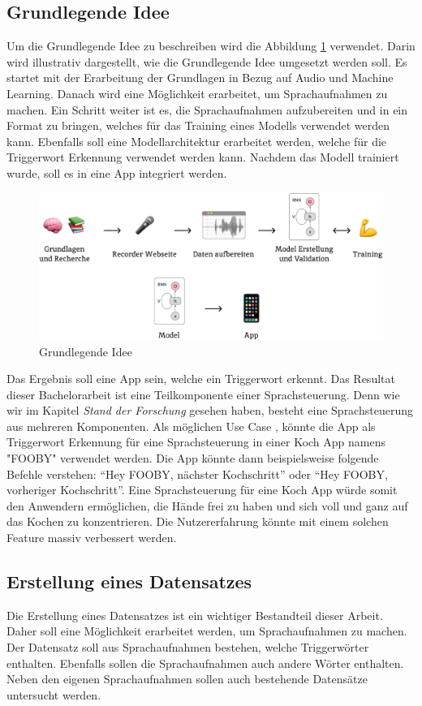 \documentclass[11pt,a4paper]{article}
\begin{document}
\subsection{Grundlegende Idee}
Um die Grundlegende Idee zu beschreiben wird die Abbildung \ref{fig:basic_idea} verwendet. Darin 
wird illustrativ dargestellt, wie die Grundlegende Idee umgesetzt werden soll. Es startet mit der
Erarbeitung der Grundlagen in Bezug auf Audio und Machine Learning. Danach wird eine Möglichkeit
erarbeitet, um Sprachaufnahmen zu machen. Ein Schritt weiter ist es, die Sprachaufnahmen
aufzubereiten und in ein Format zu bringen, welches für das Training eines Modells verwendet werden
kann. Ebenfalls soll eine Modellarchitektur erarbeitet werden, welche für die Triggerwort Erkennung
verwendet werden kann. Nachdem das Modell trainiert wurde, soll es in eine App integriert werden.

\begin{figure}[h]
	\centering
	\includegraphics[width=0.85\linewidth]{img/basic_idea.pdf}
	\caption{Grundlegende Idee}
	\label{fig:basic_idea}
\end{figure}

\noindent \newline
Das Ergebnis soll eine App sein, welche ein Triggerwort erkennt. Das Resultat dieser Bachelorarbeit
ist eine Teilkomponente einer Sprachsteuerung. Denn wie wir im Kapitel \textit{Stand der Forschung}
gesehen haben, besteht eine Sprachsteuerung aus mehreren Komponenten. Als möglichen Use Case
, könnte die App als Triggerwort Erkennung für eine Sprachsteuerung in einer Koch App namens 
"FOOBY" verwendet werden. Die App könnte dann beispielsweise folgende Befehle verstehen: ``Hey FOOBY, 
nächster Kochschritt'' oder ``Hey FOOBY, vorheriger Kochschritt''. Eine Sprachsteuerung für eine Koch App
würde somit den Anwendern ermöglichen, die Hände frei zu haben und sich voll und ganz auf das
Kochen zu konzentrieren. Die Nutzererfahrung könnte mit einem solchen Feature massiv verbessert
werden.

\subsection{Erstellung eines Datensatzes}
Die Erstellung eines Datensatzes ist ein wichtiger Bestandteil dieser Arbeit. Daher soll eine 
Möglichkeit erarbeitet werden, um Sprachaufnahmen zu machen. Der Datensatz soll aus Sprachaufnahmen
bestehen, welche Triggerwörter enthalten. Ebenfalls sollen die Sprachaufnahmen auch andere Wörter
enthalten. Neben den eigenen Sprachaufnahmen sollen auch bestehende Datensätze untersucht werden.
\end{document}
